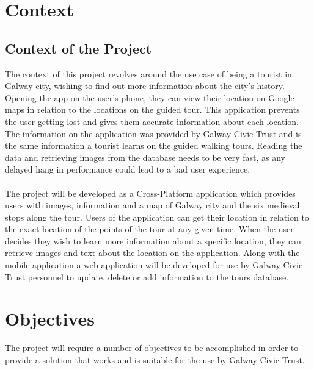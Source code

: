 \section{Context}

\subsection{Context of the Project}
The context of this project revolves around the use case of being a tourist in Galway city, wishing to find out more information about the city's history. Opening the app on the user’s phone, they can view their location on Google maps in relation to the locations on the guided tour. This application prevents the user getting lost and gives them accurate information about each location. The information on the application was provided by Galway Civic Trust and is the same information a tourist learns on the guided walking tours. Reading the data and retrieving images from the database needs to be very fast, as any delayed hang in performance could lead to a bad user experience.
\paragraph{}The project will be developed as a Cross-Platform application which provides users with images, information and a map of Galway city and the six medieval stops along the tour. Users of the application can get their location in relation to the exact location of the points of the tour at any given time. When the user decides they wish to learn more information about a specific location, they can retrieve images and text about the location on the application. Along with the mobile application a web application will be developed for use by Galway Civic Trust personnel to update, delete or add information to the tours database.

\section{Objectives} 

The project will require a number of objectives to be accomplished in order to provide a solution that works and is suitable for the use by Galway Civic Trust. 

